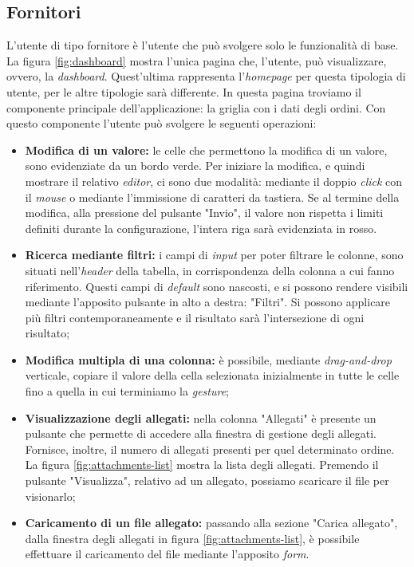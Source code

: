 \subsection{Fornitori}
L'utente di tipo fornitore è l'utente che può svolgere solo le funzionalità di base.
La figura \ref{fig:dashboard} mostra l'unica pagina che, l'utente, può visualizzare, ovvero, la \emph{dashboard}.
Quest'ultima rappresenta l'\emph{homepage} per questa tipologia di utente, per le altre tipologie sarà differente.
In questa pagina troviamo il componente principale dell'applicazione: la griglia con i dati degli ordini.
Con questo componente l'utente può svolgere le seguenti operazioni:

\begin{itemize}
  \item \textbf{Modifica di un valore:} le celle che permettono la modifica di un valore, sono evidenziate da un bordo verde. Per iniziare la modifica, e quindi mostrare il relativo \emph{editor}, ci sono due modalità: mediante il doppio \emph{click} con il \emph{mouse} o mediante l'immissione di caratteri da tastiera. Se al termine della modifica, alla pressione del pulsante "Invio", il valore non rispetta i limiti definiti durante la configurazione, l'intera riga sarà evidenziata in rosso.
  \item \textbf{Ricerca mediante filtri:} i campi di \emph{input} per poter filtrare le colonne, sono situati nell'\emph{header} della tabella, in corrispondenza della colonna a cui fanno riferimento. Questi campi di \emph{default} sono nascosti, e si possono rendere visibili mediante l'apposito pulsante in alto a destra: "Filtri". Si possono applicare più filtri contemporaneamente e il risultato sarà l'intersezione di ogni risultato;
  \item \textbf{Modifica multipla di una colonna:} è possibile, mediante \emph{drag-and-drop} verticale, copiare il valore della cella selezionata inizialmente in tutte le celle fino a quella in cui terminiamo la \emph{gesture};
  \item \textbf{Visualizzazione degli allegati:} nella colonna "Allegati" è presente un pulsante che permette di accedere alla finestra di gestione degli allegati. Fornisce, inoltre, il numero di allegati presenti per quel determinato ordine. La figura \ref{fig:attachments-list} mostra la lista degli allegati. Premendo il pulsante "Visualizza", relativo ad un allegato, possiamo scaricare il file per visionarlo;
  \item \textbf{Caricamento di un file allegato:} passando alla sezione "Carica allegato", dalla finestra degli allegati in figura \ref{fig:attachments-list}, è possibile effettuare il caricamento del file mediante l'apposito \emph{form}.
\end{itemize}

